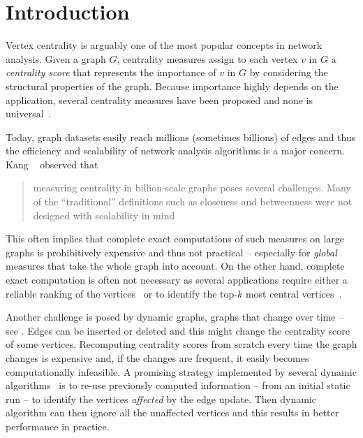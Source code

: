 \chapter*{Introduction}
Vertex centrality is arguably one of the most popular concepts
in network analysis. Given a graph $G$, centrality measures
assign to each vertex $v$ in $G$ a \emph{centrality score}
that represents the importance of $v$ in $G$ by considering
the structural properties of the graph.
Because importance highly depends on the application, several centrality
measures have been proposed and none is
universal~\cite{DBLP:journals/it/GrintenAM20,DBLP:journals/im/BoldiV14}.

Today, graph datasets easily reach millions (sometimes billions) of edges
and thus the efficiency and scalability of network analysis algorithms
is a major concern.
Kang \etal~\cite{DBLP:conf/sdm/KangPST11} observed that
\blockquote{measuring centrality in billion-scale graphs
poses several challenges. Many of the \enquote{traditional}
definitions such as closeness and betweenness were not designed
with scalability in mind}. This often implies that complete exact computations
of such measures on large graphs is prohibitively expensive and thus not
practical -- especially for \emph{global} measures that take the whole graph
into account.
On the other hand, complete exact computation is often not necessary
as several applications require either a reliable ranking of the
vertices~\cite{DBLP:conf/faw/OkamotoCL08,newman2018networks} or to identify the
top-$k$ most central vertices~\cite{DBLP:conf/icde/OlsenLH14}.

Another challenge is posed by dynamic graphs, \ie graphs that change over time
-- see . Edges can be inserted or deleted and this
might change the centrality score of some vertices. Recomputing centrality scores
from scratch every time the graph changes is expensive and, if the changes are
frequent, it easily becomes computationally infeasible.
A promising strategy implemented by several dynamic
algorithms~\cite{DBLP:journals/im/BergaminiM16,DBLP:conf/socialcom/GreenMB12,
DBLP:conf/asunam/KasCC13,DBLP:conf/wea/BergaminiMOS17} is to re-use
previously computed information -- \eg from an initial static run -- to
identify the vertices \emph{affected} by the edge update. Then dynamic
algorithm can then ignore all the unaffected vertices and this results in
better performance in practice.


